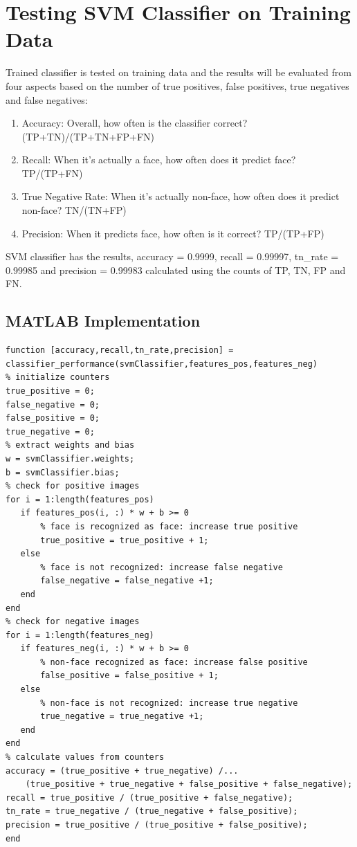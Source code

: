 \documentclass{article}
\begin{document}
\section{Testing SVM Classifier on Training Data}
Trained classifier is tested on training data and the results will be evaluated from four aspects based on the number of true positives, false positives, true negatives and false negatives:

\begin{enumerate} 
\item Accuracy: Overall, how often is the classifier correct?  (TP+TN)/(TP+TN+FP+FN)
\item Recall: When it's actually a face, how often does it predict face?  TP/(TP+FN)
\item True Negative Rate: When it's actually non-face, how often does it predict non-face? TN/(TN+FP)
\item Precision: When it predicts face, how often is it correct? TP/(TP+FP)
\end{enumerate}

SVM classifier has the results, accuracy = 0.9999, recall = 0.99997, tn\_rate = 0.99985 and precision = 0.99983 calculated using the counts of TP, TN, FP and FN.

\subsection{MATLAB Implementation}
\begin{lstlisting}[caption={My implementation of classifier\_performance function.},captionpos=b]
function [accuracy,recall,tn_rate,precision] = classifier_performance(svmClassifier,features_pos,features_neg)
% initialize counters
true_positive = 0;
false_negative = 0;
false_positive = 0;
true_negative = 0;
% extract weights and bias
w = svmClassifier.weights;
b = svmClassifier.bias;
% check for positive images
for i = 1:length(features_pos)
   if features_pos(i, :) * w + b >= 0
       % face is recognized as face: increase true positive
       true_positive = true_positive + 1;
   else
       % face is not recognized: increase false negative
       false_negative = false_negative +1;
   end
end
% check for negative images
for i = 1:length(features_neg)
   if features_neg(i, :) * w + b >= 0
       % non-face recognized as face: increase false positive
       false_positive = false_positive + 1;
   else
       % non-face is not recognized: increase true negative
       true_negative = true_negative +1;
   end
end
% calculate values from counters
accuracy = (true_positive + true_negative) /...
    (true_positive + true_negative + false_positive + false_negative);
recall = true_positive / (true_positive + false_negative);
tn_rate = true_negative / (true_negative + false_positive);
precision = true_positive / (true_positive + false_positive);
end
\end{lstlisting}
\end{document}
